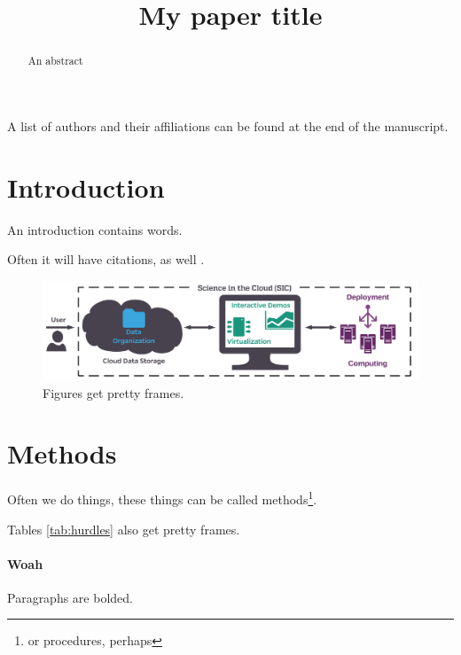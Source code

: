\documentclass[12pt]{article}
\title{My paper title}
\begin{document}
\renewcommand{\onlyinsubfile}[1]{}  %
\renewcommand{\notinsubfile}[1]{#1} %

\maketitle
\begin{center} {\small\color{lgray}A list of authors and their affiliations can be found at the end of the manuscript.}\end{center}
\thispagestyle{empty}
\medskip

\begin{abstract}
An abstract
\end{abstract}

\section{Introduction}

An introduction contains words.

Often it will have citations, as well \cite{grillner, poldrack2014making}.

\begin{figure}[h!]
\begin{cframed}
\centering
\includegraphics[width=\textwidth]{./figs/example_fig.pdf}
\caption{Figures get pretty frames.}
\label{fig:sic}
\end{cframed}
\end{figure}




\section{Methods}

Often we do things, these things can be called methods\footnote{or procedures, perhaps}.

% 
Tables \ref{tab:hurdles} also get pretty frames. 

\paragraph{Woah}
Paragraphs are bolded.
 
\end{document}
